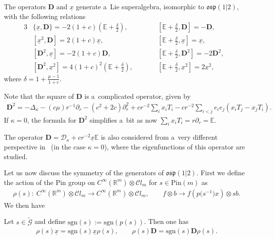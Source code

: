 \documentclass[pdftex]{sigma}
\numberwithin{equation}{section}
\numberwithin{theorem}{section}
\numberwithin{proposition}{section}
\numberwithin{lemma}{section}
\numberwithin{corollary}{section}
\numberwithin{definition}{section}
\numberwithin{example}{section}
\numberwithin{remark}{section}
\numberwithin{note}{section}
\theoremstyle{remark}
\newcommand{\mR}{\mathbb{R}}
\newcommand{\mE}{\mathbb{E}}
\newcommand{\cD}{\mathcal{D}}
\newcommand{\cC}{\mathcal{C}}
\newcommand{\cG}{\mathcal{G}}
\newcommand{\dD}{\textbf{D}}
\newcommand{\ux}{\underline{x}}
\def\k{{\kappa}}
\begin{document}
\begin{theorem}\label{ospFamily}
The operators $\dD$ and $\ux$ generate a~Lie superalgebra, isomorphic to $\mathfrak{osp}(1|2)$,
with the following relations
\begin{alignat*}{3}
& \{\ux,\dD\}=-2(1+c)\left(\mE+\frac{\delta}{2}\right),\qquad&&
\left[\mE+\frac{\delta}{2},\dD\right]=-\dD,& \\
& \left[\ux^{2},\dD\right]=2(1+c)\ux,\qquad&&
\left[\mE+\frac{\delta}{2},\ux\right]=\ux,& \\
& \left[\dD^{2},\ux\right]=-2(1+c)\dD,\qquad&&
\left[\mE+\frac{\delta}{2},\dD^{2}\right]=-2\dD^{2},&\\
& \left[\dD^{2},\ux^{2}\right]=4(1+c)^{2}\left(\mE+\frac{\delta}{2}\right),\qquad&&
\left[\mE+\frac{\delta}{2},\ux^{2}\right]=2\ux^{2},&
\end{alignat*}
where $\delta=1+\frac{\mu-1}{1+c}$.
\end{theorem}

Note that the square of $\dD$ is a~complicated operator, given by
\begin{gather*}
\dD^{2}=-\Delta_{\k}-\left(c\mu\right)r^{-1}\partial_{r}
-\left(c^{2}+2c\right)\partial_{r}^{2}+c r^{-2}\sum_{i}x_{i}T_{i}
-c r^{-2}\sum_{i<j}e_{i}e_{j}(x_{i}T_{j}-x_{j}T_{i}).
\end{gather*}
If $\k=0$, the formula for $\dD^{2}$ simplif\/ies a~bit as now $\sum_{i}x_{i}T_{i}=r
\partial_{r}=\mE$.

\begin{remark}
The operator $\dD=\cD_{\k}+c r^{-2}\ux\mE$ is also considered from a~very dif\/ferent
perspective in~\cite{MR2269930} (in the case $\k=0$), where the eigenfunctions of this operator
are studied.
\end{remark}

Let us now discuss the symmetry of the generators of $\mathfrak{osp}(1|2)$.
First we def\/ine the action of the Pin group on $C^{\infty}(\mR^{m})\otimes\cC l_{m}$ for $s\in
\mathrm{Pin}(m)$ as
\begin{gather*}
\rho(s): \ C^{\infty}(\mR^{m}) \otimes \cC l_{m} \rightarrow C^{\infty}(\mR^{m}) \otimes \cC l_{m},\qquad
 f\otimes b \rightarrow f (p\big(s^{-1}\big)x) \otimes s b.
\end{gather*}
We then have
\begin{proposition}\label{equivarianceG}
Let $s\in\widetilde{\cG}$ and define $\mathrm{sgn}(s):=\mathrm{sgn}(p(s))$.
Then one has
\begin{gather*}
\rho(s) \ux = \mathrm{sgn}(s) \ux \rho(s),\qquad
\rho(s) \dD = \mathrm{sgn}(s) \dD \rho(s).
\end{gather*}
\end{proposition}
\end{document}
